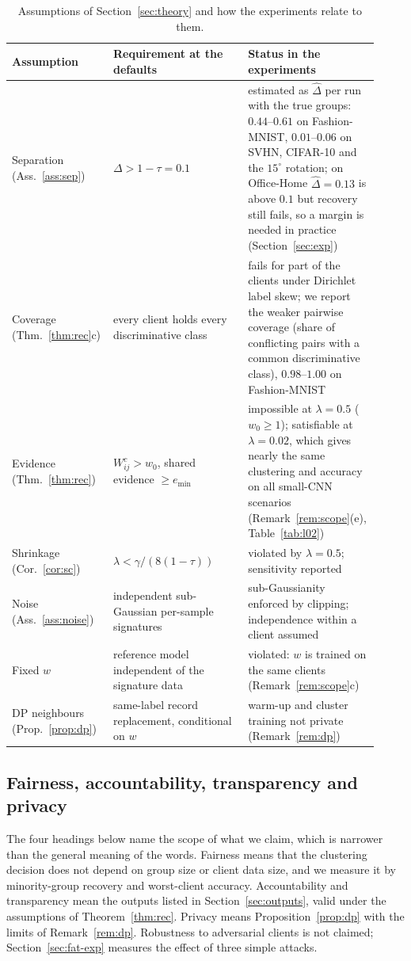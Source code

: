 \documentclass[11pt]{article}
\theoremstyle{definition}
\theoremstyle{remark}
\begin{document}
\begin{table}[!htbp]
\centering
\caption{Assumptions of Section~\ref{sec:theory} and how the experiments relate to them.}\label{tab:assumptions}
\small
\begin{tabular}{p{0.21\linewidth}p{0.36\linewidth}p{0.35\linewidth}}
\toprule
Assumption & Requirement at the defaults & Status in the experiments \\
\midrule
Separation (Ass.~\ref{ass:sep}) & $\Delta>1-\tau=0.1$ & estimated as $\hat\Delta$ per run with the true groups: $0.44$--$0.61$ on Fashion-MNIST, $0.01$--$0.06$ on SVHN, CIFAR-10 and the $15^\circ$ rotation; on Office-Home $\hat\Delta=0.13$ is above $0.1$ but recovery still fails, so a margin is needed in practice (Section~\ref{sec:exp}) \\
Coverage (Thm.~\ref{thm:rec}c) & every client holds every discriminative class & fails for part of the clients under Dirichlet label skew; we report the weaker pairwise coverage (share of conflicting pairs with a common discriminative class), $0.98$--$1.00$ on Fashion-MNIST \\
Evidence (Thm.~\ref{thm:rec}) & $W^c_{ij}>w_0$, shared evidence $\ge e_{\min}$ & impossible at $\lambda=0.5$ ($w_0\ge1$); satisfiable at $\lambda=0.02$, which gives nearly the same clustering and accuracy on all small-CNN scenarios (Remark~\ref{rem:scope}(e), Table~\ref{tab:l02}) \\
Shrinkage (Cor.~\ref{cor:sc}) & $\lambda<\gamma/(8(1-\tau))$ & violated by $\lambda=0.5$; sensitivity reported \\
Noise (Ass.~\ref{ass:noise}) & independent sub-Gaussian per-sample signatures & sub-Gaussianity enforced by clipping; independence within a client assumed \\
Fixed $w$ & reference model independent of the signature data & violated: $w$ is trained on the same clients (Remark~\ref{rem:scope}c) \\
DP neighbours (Prop.~\ref{prop:dp}) & same-label record replacement, conditional on $w$ & warm-up and cluster training not private (Remark~\ref{rem:dp}) \\
\bottomrule
\end{tabular}
\end{table}

\subsection{Fairness, accountability, transparency and privacy}\label{sec:fat}
The four headings below name the scope of what we claim, which is narrower than the general meaning of the words. Fairness means that the clustering decision does not depend on group size or client data size, and we measure it by minority-group recovery and worst-client accuracy. Accountability and transparency mean the outputs listed in Section~\ref{sec:outputs}, valid under the assumptions of Theorem~\ref{thm:rec}. Privacy means Proposition~\ref{prop:dp} with the limits of Remark~\ref{rem:dp}. Robustness to adversarial clients is not claimed; Section~\ref{sec:fat-exp} measures the effect of three simple attacks.
\end{document}

